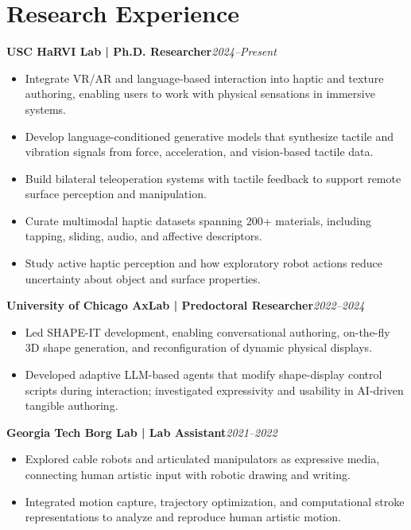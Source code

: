 \documentclass[11pt,letterpaper]{article}
\newcommand{\role}[2]{\textbf{#1}\hfill\textit{#2}\par}
\begin{document}
\section*{Research Experience}
\role{USC HaRVI Lab | Ph.D. Researcher}{2024--Present}
\begin{itemize}
\item Integrate VR/AR and language-based interaction into haptic and texture authoring, enabling users to work with physical sensations in immersive systems.
\item Develop language-conditioned generative models that synthesize tactile and vibration signals from force, acceleration, and vision-based tactile data.
\item Build bilateral teleoperation systems with tactile feedback to support remote surface perception and manipulation.
\item Curate multimodal haptic datasets spanning 200+ materials, including tapping, sliding, audio, and affective descriptors.
\item Study active haptic perception and how exploratory robot actions reduce uncertainty about object and surface properties.
\end{itemize}
\vspace{3pt}
\role{University of Chicago AxLab | Predoctoral Researcher}{2022--2024}
\begin{itemize}
\item Led SHAPE-IT development, enabling conversational authoring, on-the-fly 3D shape generation, and reconfiguration of dynamic physical displays.
\item Developed adaptive LLM-based agents that modify shape-display control scripts during interaction; investigated expressivity and usability in AI-driven tangible authoring.
\end{itemize}
\vspace{3pt}
\role{Georgia Tech Borg Lab | Lab Assistant}{2021--2022}
\begin{itemize}
\item Explored cable robots and articulated manipulators as expressive media, connecting human artistic input with robotic drawing and writing.
\item Integrated motion capture, trajectory optimization, and computational stroke representations to analyze and reproduce human artistic motion.
\end{itemize}
\end{document}
